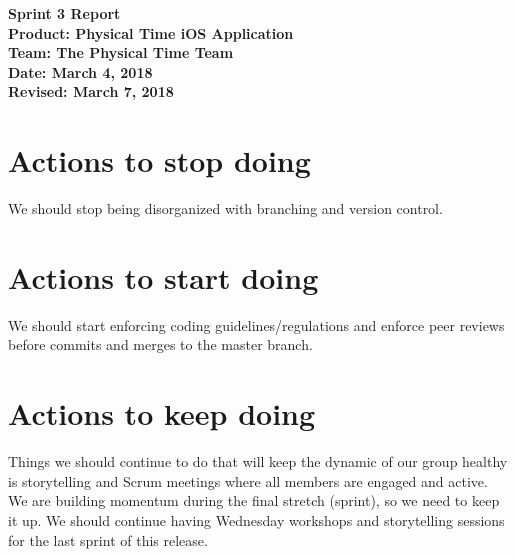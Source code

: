 \documentclass[11pt]{article}
\newcommand\tab[1][1cm]{\hspace*{#1}}
\begin{document}
	\Large{\textbf{Sprint 3 Report}}\\
	\Large{\textbf{Product: Physical Time iOS Application}}\\
	\Large{\textbf{Team: The Physical Time Team}}\\
	\Large{\textbf{Date: March 4, 2018}}\\
	\Large{\textbf{Revised: March 7, 2018}}\\

	\vspace{-3mm}

	\section{Actions to stop doing}
		\vspace{-3mm}
		\tab \normalsize{We should stop being disorganized with branching and version control.}

	\section{Actions to start doing}
		\vspace{-3mm}
		\tab \normalsize{We should start enforcing coding guidelines/regulations and enforce peer reviews before commits and merges to the master branch.}

	\section{Actions to keep doing}
		\vspace{-3mm}
		\tab \normalsize{Things we should continue to do that will keep the dynamic of our group healthy is storytelling and Scrum meetings where all members are engaged and active. We are building momentum during the final stretch (sprint), so we need to keep it up.  We should continue having Wednesday workshops and storytelling sessions for the last sprint of this release.}
\end{document}
